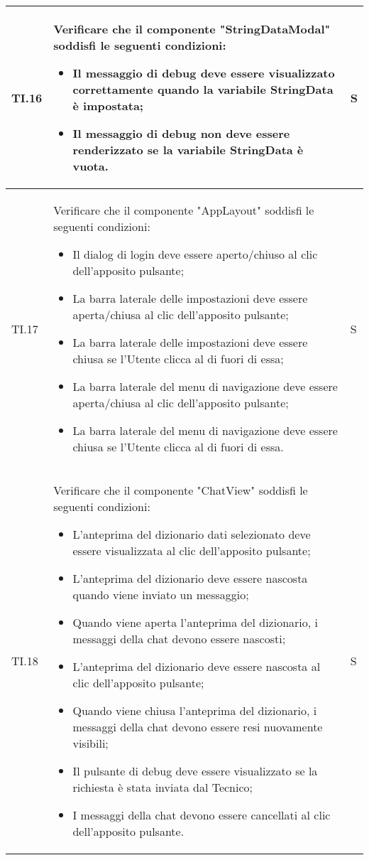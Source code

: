 \begin{adjustwidth}{-0.5cm}{-0.5cm}
\begin{longtable}{|P{1.5cm}|>{\raggedright}P{9.5cm}|>{\arraybackslash}P{1.5cm}|}
    \hline TI.16 & Verificare che il componente "StringDataModal" soddisfi le seguenti condizioni:
    \begin{itemize}
      \item Il messaggio di debug deve essere visualizzato correttamente quando la variabile StringData è impostata;
      \item Il messaggio di debug non deve essere renderizzato se la variabile StringData è vuota.
    \end{itemize} & S \\

    \hline TI.17 & Verificare che il componente "AppLayout" soddisfi le seguenti condizioni:
    \begin{itemize}
      \item Il dialog di login deve essere aperto/chiuso al clic dell'apposito pulsante;
      \item La barra laterale delle impostazioni deve essere aperta/chiusa al clic dell'apposito pulsante;
      \item La barra laterale delle impostazioni deve essere chiusa se l'Utente clicca al di fuori di essa;
      \item La barra laterale del menu di navigazione deve essere aperta/chiusa al clic dell'apposito pulsante;
      \item La barra laterale del menu di navigazione deve essere chiusa se l'Utente clicca al di fuori di essa.
    \end{itemize} & S \\

    \hline TI.18 & Verificare che il componente "ChatView" soddisfi le seguenti condizioni:
    \begin{itemize}
      \item L'anteprima del dizionario dati selezionato deve essere visualizzata al clic dell'apposito pulsante;
      \item L'anteprima del dizionario deve essere nascosta quando viene inviato un messaggio;
      \item Quando viene aperta l'anteprima del dizionario, i messaggi della chat devono essere nascosti;
      \item L'anteprima del dizionario deve essere nascosta al clic dell'apposito pulsante;
      \item Quando viene chiusa l'anteprima del dizionario, i messaggi della chat devono essere resi nuovamente visibili;
      \item Il pulsante di debug deve essere visualizzato se la richiesta è stata inviata dal Tecnico;
      \item I messaggi della chat devono essere cancellati al clic dell'apposito pulsante.
    \end{itemize} & S \\
	\end{longtable}
\end{adjustwidth}
\egroup
